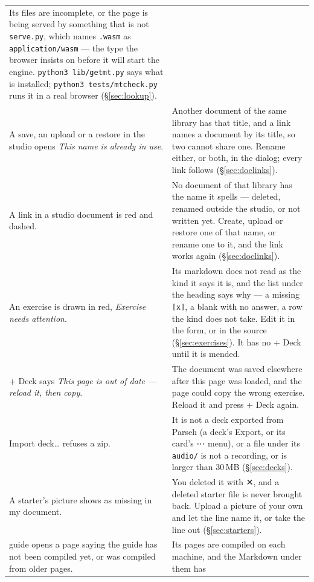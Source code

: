 \documentclass[11pt,oneside]{report}
\newcommand{\sym}[1]{{\symfont #1}}
\newcommand{\file}[1]{\texttt{#1}}
\newcommand{\menu}[1]{\textsf{#1}}
\begin{document}
\begin{center}
\begin{longtable}{@{}p{}p{}@{}}
  Its files are incomplete, or the page is being served by something that is
  not \file{serve.py}, which names \file{.wasm} as
  \texttt{application/wasm} --- the type the browser insists on before it
  will start the engine. \file{python3 lib/getmt.py} says what is installed;
  \file{python3 tests/mtcheck.py} runs it in a real browser
  (\S\ref{sec:lookup}). \\
\addlinespace
A save, an upload or a restore in the studio opens \emph{This name is
already in use}. &
  Another document of the same library has that title, and a link names a
  document by its title, so two cannot share one. Rename either, or both, in
  the dialog; every link follows (\S\ref{sec:doclinks}). \\
\addlinespace
A link in a studio document is red and dashed. &
  No document of that library has the name it spells --- deleted, renamed
  outside the studio, or not written yet. Create, upload or restore one of
  that name, or rename one to it, and the link works again
  (\S\ref{sec:doclinks}). \\
\addlinespace
An exercise is drawn in red, \emph{Exercise needs attention}. &
  Its markdown does not read as the kind it says it is, and the list under
  the heading says why --- a missing \texttt{[x]}, a blank with no answer, a
  row the kind does not take. \menu{Edit} it in the form, or in the source
  (\S\ref{sec:exercises}). It has no \menu{+ Deck} until it is mended. \\
\addlinespace
\menu{+ Deck} says \emph{This page is out of date --- reload it, then
copy}. &
  The document was saved elsewhere after this page was loaded, and the page
  could copy the wrong exercise. Reload it and press \menu{+ Deck} again. \\
\addlinespace
\menu{Import deck\ldots} refuses a zip. &
  It is not a deck exported from Parseh (a deck's \menu{Export}, or its card's
  \menu{\sym{⋯}} menu), or a file under its \file{audio/} is not a recording,
  or is larger than 30\,MB (\S\ref{sec:decks}). \\
\addlinespace
A starter's picture shows as missing in my document. &
  You deleted it with \sym{✕}, and a deleted starter file is never brought
  back. Upload a picture of your own and let the line name it, or take the
  line out (\S\ref{sec:starters}). \\
\addlinespace
\menu{guide} opens a page saying the guide has not been compiled yet, or was
compiled from older pages. &
  Its pages are compiled on each machine, and the Markdown under them has

\end{longtable}
\end{center}
\end{document}
